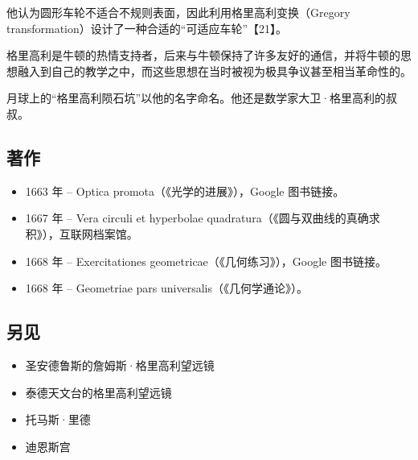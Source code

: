 他认为圆形车轮不适合不规则表面，因此利用格里高利变换（Gregory transformation）设计了一种合适的“可适应车轮”【21】。  

格里高利是牛顿的热情支持者，后来与牛顿保持了许多友好的通信，并将牛顿的思想融入到自己的教学之中，而这些思想在当时被视为极具争议甚至相当革命性的。  

月球上的“格里高利陨石坑”以他的名字命名。他还是数学家大卫·格里高利的叔叔。  
\subsection{著作}
\begin{itemize}
\item 1663 年 – Optica promota（《光学的进展》），Google 图书链接。
\item 1667 年 – Vera circuli et hyperbolae quadratura（《圆与双曲线的真确求积》），互联网档案馆。
\item 1668 年 – Exercitationes geometricae（《几何练习》），Google 图书链接。
\item 1668 年 – Geometriae pars universalis（《几何学通论》）。
\end{itemize}
\subsection{另见}
\begin{itemize}
\item 圣安德鲁斯的詹姆斯·格里高利望远镜
\item 泰德天文台的格里高利望远镜
\item 托马斯·里德
\item 迪恩斯宫
\end{itemize}
